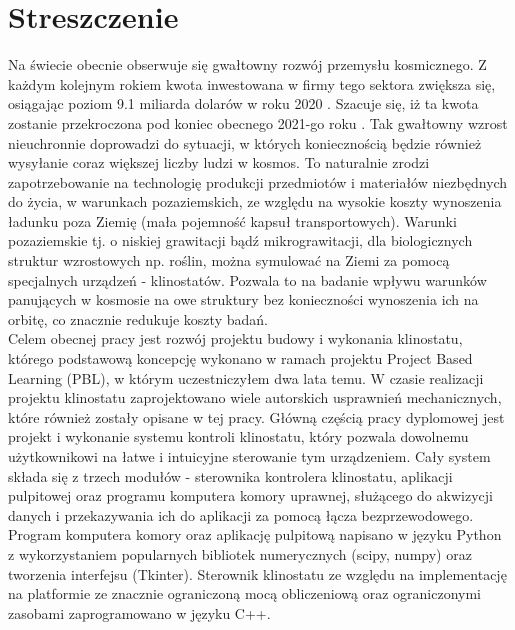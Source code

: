 \chapter*{Streszczenie}

Na świecie obecnie obserwuje się gwałtowny rozwój przemysłu kosmicznego. Z każdym kolejnym
 rokiem kwota inwestowana w firmy tego sektora zwiększa się, osiągając poziom 9.1 miliarda
  dolarów w roku 2020 \cite{bib:kosmos_raport_kwartalny_2021}. Szacuje się, iż ta kwota
   zostanie przekroczona pod koniec obecnego 2021-go roku
    \cite{bib:kosmos_raport_kwartalny_2021}. Tak gwałtowny wzrost nieuchronnie doprowadzi do
     sytuacji, w których koniecznością będzie również wysyłanie coraz większej liczby ludzi
      w kosmos. To naturalnie zrodzi zapotrzebowanie na technologię produkcji przedmiotów i
       materiałów niezbędnych do życia, w warunkach pozaziemskich, ze względu na wysokie
        koszty wynoszenia ładunku poza Ziemię (mała pojemność kapsuł transportowych).
         Warunki pozaziemskie tj. o niskiej grawitacji bądź mikrograwitacji, dla
          biologicznych struktur wzrostowych np. roślin, można symulować na Ziemi za pomocą
           specjalnych urządzeń - klinostatów. Pozwala to na badanie wpływu warunków
            panujących w kosmosie na owe struktury bez konieczności wynoszenia ich na
             orbitę, co znacznie redukuje koszty badań.\\

Celem obecnej pracy jest rozwój projektu budowy i wykonania klinostatu, którego podstawową
 koncepcję wykonano w ramach projektu Project Based Learning (PBL), w którym uczestniczyłem
  dwa lata temu. W czasie realizacji projektu klinostatu zaprojektowano wiele autorskich
   usprawnień mechanicznych, które również zostały opisane w tej pracy. Główną częścią pracy
    dyplomowej jest projekt i wykonanie systemu kontroli klinostatu, który pozwala dowolnemu
     użytkownikowi na łatwe i intuicyjne sterowanie tym urządzeniem. Cały system składa się
      z trzech modułów - sterownika kontrolera klinostatu, aplikacji pulpitowej oraz
       programu komputera komory uprawnej, służącego do akwizycji danych i przekazywania ich
        do aplikacji za pomocą łącza bezprzewodowego. Program komputera komory oraz
         aplikację pulpitową napisano w języku Python z wykorzystaniem popularnych bibliotek
          numerycznych (scipy, numpy) oraz tworzenia interfejsu (Tkinter). Sterownik klinostatu ze
           względu na implementację na platformie ze znacznie ograniczoną mocą obliczeniową
            oraz ograniczonymi zasobami zaprogramowano w języku C++. \\

